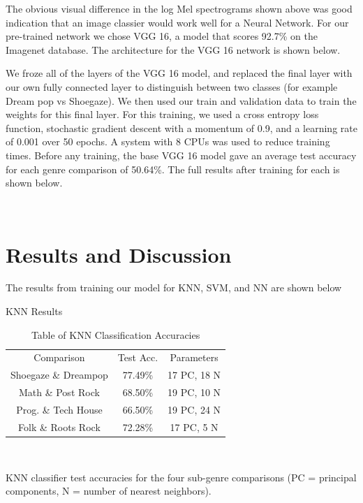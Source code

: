 \documentclass[letterpaper, 12 pt, conference]{ieeeconf}  %
\begin{document}
The obvious visual difference in the log Mel spectrograms shown above was good indication that an image classier would work well for a Neural Network. For our pre-trained network we chose VGG 16, a model that scores 92.7\% on the Imagenet database. The architecture for the VGG 16 network is shown below.



We froze all of the layers of the VGG 16 model, and replaced the final layer with our own fully connected layer to distinguish between two classes (for example Dream pop vs Shoegaze). We then used our train and validation data to train the weights for this final layer. For this training, we used a cross entropy loss function, stochastic gradient descent with a momentum of 0.9, and a learning rate of 0.001 over 50 epochs. A system with 8 CPUs was used to reduce training times. Before any training, the base VGG 16 model gave an average test accuracy for each genre comparison of 50.64\%. The full results after training for each is shown below.


\newline \,\,


\section{Results and Discussion}

The results from training our model for KNN, SVM, and NN are shown below
\newline \,\,

\par KNN Results

\begin{table}[!hb]
    \begin{center}
    \caption{Table of KNN Classification Accuracies}{\label{tab:knn_acc}}
    \begin{tabular}{ |c|c|c| }
      Comparison & Test Acc. & Parameters \\ 
      Shoegaze \& Dreampop & 77.49\% & 17 PC, 18 N\\
      Math \& Post Rock & 68.50\% & 19 PC, 10 N\\
      Prog. \& Tech House & 66.50\% & 19 PC, 24 N\\
      Folk \& Roots Rock & 72.28\% & 17 PC, 5 N\\
     
    \end{tabular}\\
    \end{center}
    KNN classifier test accuracies for the four sub-genre comparisons (PC = principal components, N = number of nearest neighbors). 
\end{table}
\end{document}
